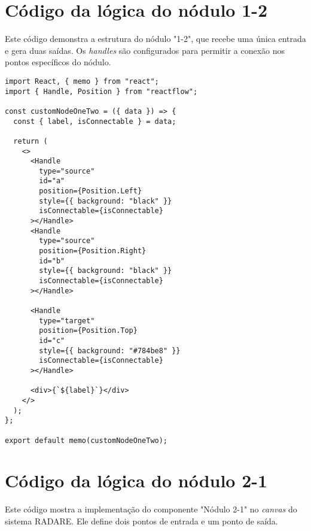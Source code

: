 \chapter{Código da lógica do nódulo 1-2}
\label{Anexo:frontCodeNodeOneTwo}

Este código demonstra a estrutura do nódulo "1-2", que recebe uma única entrada e gera duas saídas. Os \textit{handles} são configurados para permitir a conexão nos pontos específicos do nódulo.

\begin{verbatim}
import React, { memo } from "react";
import { Handle, Position } from "reactflow";

const customNodeOneTwo = ({ data }) => {
  const { label, isConnectable } = data;

  return (
    <>
      <Handle
        type="source"
        id="a"
        position={Position.Left}
        style={{ background: "black" }}
        isConnectable={isConnectable}
      ></Handle>
      <Handle
        type="source"
        position={Position.Right}
        id="b"
        style={{ background: "black" }}
        isConnectable={isConnectable}
      ></Handle>

      <Handle
        type="target"
        position={Position.Top}
        id="c"
        style={{ background: "#784be8" }}
        isConnectable={isConnectable}
      ></Handle>

      <div>{`${label}`}</div>
    </>
  );
};

export default memo(customNodeOneTwo);
\end{verbatim}

\chapter{Código da lógica do nódulo 2-1}
\label{Cap:NodeTwoOneCode}

Este código mostra a implementação do componente "Nódulo 2-1" no \textit{canvas} do sistema RADARE. Ele define dois pontos de entrada e um ponto de saída.

